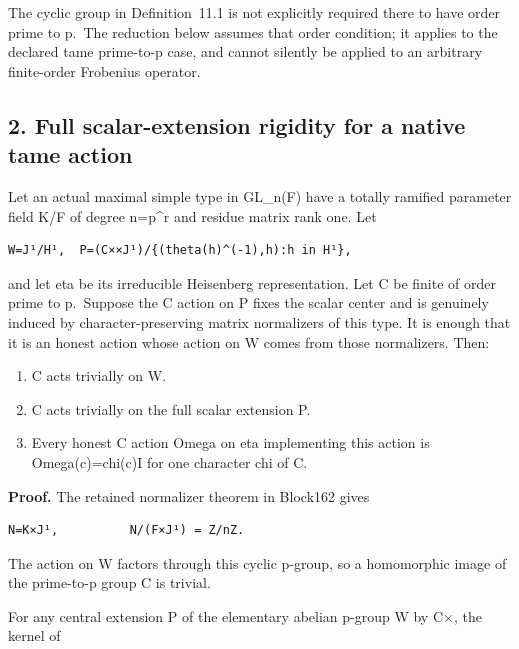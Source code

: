 The cyclic group in Definition~11.1 is not explicitly required there to
have order prime to p.~The reduction below assumes that order condition;
it applies to the declared tame prime-to-p case, and cannot silently be
applied to an arbitrary finite-order Frobenius operator.

\hypertarget{stabilizer_contract-full-scalar-extension-rigidity-for-a-native-tame-action}{%
\subsection{2. Full scalar-extension rigidity for a native tame
action}\label{stabilizer_contract-full-scalar-extension-rigidity-for-a-native-tame-action}}

Let an actual maximal simple type in GL\_n(F) have a totally ramified
parameter field K/F of degree n=p\^{}r and residue matrix rank one. Let

\begin{Verbatim}[fontsize=\small,breaklines=true,breakanywhere=true]
W=J¹/H¹,  P=(C××J¹)/{(theta(h)^(-1),h):h in H¹},
\end{Verbatim}

and let eta be its irreducible Heisenberg representation. Let C be
finite of order prime to p.~Suppose the C action on P fixes the scalar
center and is genuinely induced by character-preserving matrix
normalizers of this type. It is enough that it is an honest action whose
action on W comes from those normalizers. Then:

\begin{enumerate}
\def\labelenumi{\arabic{enumi}.}
\tightlist
\item
  C acts trivially on W.
\item
  C acts trivially on the full scalar extension P.
\item
  Every honest C action Omega on eta implementing this action is
  Omega(c)=chi(c)I for one character chi of C.
\end{enumerate}

\textbf{Proof.} The retained normalizer theorem in Block162 gives

\begin{Verbatim}[fontsize=\small,breaklines=true,breakanywhere=true]
N=K×J¹,          N/(F×J¹) = Z/nZ.
\end{Verbatim}

The action on W factors through this cyclic p-group, so a homomorphic
image of the prime-to-p group C is trivial.

For any central extension P of the elementary abelian p-group W by C×,
the kernel of

